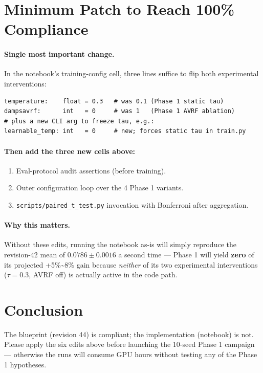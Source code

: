 \documentclass[11pt,a4paper]{article}
\begin{document}
\section{Minimum Patch to Reach 100\% Compliance}

\paragraph{Single most important change.} In the notebook's training-config cell, three lines suffice to flip both experimental interventions:

\begin{lstlisting}
temperature:    float = 0.3   # was 0.1 (Phase 1 static tau)
dampsavrf:      int   = 0     # was 1   (Phase 1 AVRF ablation)
# plus a new CLI arg to freeze tau, e.g.:
learnable_temp: int   = 0     # new; forces static tau in train.py
\end{lstlisting}

\paragraph{Then add the three new cells above:}
\begin{enumerate}[leftmargin=*]
    \item Eval-protocol audit assertions (before training).
    \item Outer configuration loop over the 4 Phase 1 variants.
    \item \texttt{scripts/paired\_t\_test.py} invocation with Bonferroni after aggregation.
\end{enumerate}

\paragraph{Why this matters.} Without these edits, running the notebook as-is will simply reproduce the revision-42 mean of $0.0786 \pm 0.0016$ a second time --- Phase 1 will yield \textbf{zero} of its projected +5\%\textasciitilde{}8\% gain because \emph{neither} of its two experimental interventions ($\tau = 0.3$, AVRF off) is actually active in the code path.

\section{Conclusion}

\begin{mdframed}[backgroundcolor=backcolour, linecolor=codegray, linewidth=0.5pt]
The blueprint (revision 44) is compliant; the implementation (notebook) is not. Please apply the six edits above before launching the 10-seed Phase 1 campaign --- otherwise the runs will consume GPU hours without testing any of the Phase 1 hypotheses.
\end{mdframed}
\end{document}
